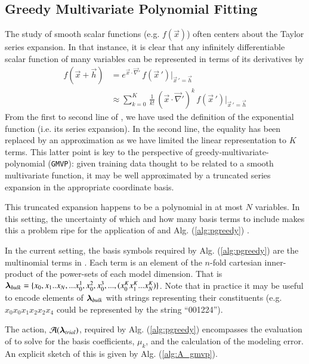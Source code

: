 \documentclass[twocolumn,aps,prd,floatfix,preprintnumbers,a4paper,nofootinbib,
superscriptaddress,10pt]{revtex4-1}
\def\gmvp#1{greedy-multivariate-polynomial#1
  (\texttt{GMVP}#1)\gdef\gmvp{\texttt{GMVP}}}
\begin{document}
\subsection{Greedy Multivariate Polynomial Fitting}
%
The study of smooth scalar functions (e.g. $f(\vec{x})$) often centers about the Taylor series expansion.
%
In that instance, it is clear that any infinitely differentiable scalar function of many variables can be represented in terms of its derivatives by
%
\begin{align}
  \label{eq:mvt}
  f( \vec{x} + \vec{h} ) &= e^{ \vec{x} \cdot \vec{\nabla}' } \, f(\vec{x}\,') |_{\vec{x}\,'=\vec{h}}
  \\ \nonumber
  &\approx \sum_{k=0}^{K} \, \frac{1}{k!} \, (\vec{x} \cdot \vec{\nabla}')^{k} \, f(\vec{x}\,') |_{\vec{x}\,'=\vec{h}}
\end{align}
%
From the first to second line of , we have used the definition of the exponential function (i.e. its series expansion).
%
In the second line, the equality has been replaced by an approximation as we have limited the linear representation to $K$ terms.
%
This latter point is key to the perspective of \gmvp{}: given training data thought to be related to a smooth multivariate function, it may be well approximated by a truncated series expansion in the appropriate coordinate basis.
%
\par This truncated expansion happens to be a polynomial in at most $N$ variables.
%
In this setting, the uncertainty of which and how many basis terms to include makes this a problem ripe for the application of  and Alg. (\ref{alg:pgreedy}) .
%
\par In the current setting, the basis symbols required by Alg. (\ref{alg:pgreedy}) are the multinomial terms in .
%
Each term is an element of the $n$-fold cartesian inner-product of the power-sets of each model dimension. That is ${\bm{\lambda}}_{bulk} = \{x_0,x_1 .. x_N, ... x_0^1, x_0^2, x_0^3, ...  , (x_0^K x_1^K ... x_N^K) \}$.
%
Note that in practice it may be useful to encode elements of ${\bm{\lambda}}_{bulk}$ with strings representing their constituents (e.g. $x_0 x_0 x_1 x_2 x_2 x_4$ could be represented by the string ``001224'').
%
\par The action, $\mathcal{A}({\bm{\lambda}}_{trial})$, required by Alg. (\ref{alg:pgreedy}) encompasses the evaluation of  to solve for the basis coefficients, $\mu_k$, and the calculation of the modeling error.
%
An explicit sketch of this is given by Alg. (\ref{alg:A_gmvp}).
%
\hspace{1cm}
\end{document}
